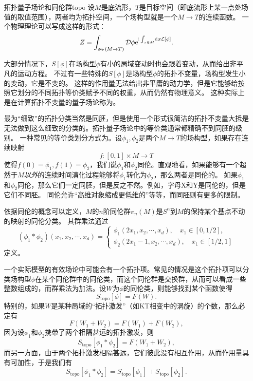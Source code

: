 \begin{back}{拓扑量子场论和同伦群}{topo}
    设$M$是底流形，$T$是目标空间（即底流形上某一点处场值的取值范围），两者均为拓扑空间，一个场构型就是一个$M \to T$的连续函数。
    一个物理理论可以写成这样的形式：
    \[
        Z = \int_{\phi \in (M \to T)} \mathcal{D} \phi \mathrm{e}^{\mathrm{i} \int_{x \in M} \dd{x} \mathcal{L}[\phi]}.
    \]

    大部分情况下，$S[\phi]$在场构型$\phi$有小的局域变动时也会跟着变动，从而给出非平凡的运动方程。
    不过有一些特殊的$S[\phi]$是场构型$\phi$的拓扑不变量，场构型发生小的变动，它是不变的。
    这样的作用量无法给出非平庸的动力学，但是它能够给按照它划分的不同拓扑等价类赋予不同的权重，从而仍然有物理意义。
    这种实际上是在计算拓扑不变量的量子场论称为。

    最为“细致”的拓扑分类当然是同胚，但是使用一个形式很简洁的拓扑不变量大抵是无法做到这么细致的分类的。拓扑量子场论中的等价类通常都精确不到同胚的级别。
    一种常见的等价类划分方式为。设$\phi_1, \phi_2$是两个$M \to T$的场构型，如果存在连续映射
    \[
        f: [0, 1] \times M \to T
    \]
    使得$f(0) = \phi_1, f(1) = \phi_2$，我们说$\phi_1$和$\phi_2$同伦。直观地看，如果能够有一个超然于$M$\emph{以外}的连续时间演化过程能够将$\phi_1$转化为$\phi_2$，那么两者是同伦的。
    如果$\phi_1$和$\phi_2$同伦，那么它们一定同胚，但是反之不然。例如，字母X和Y是同伦的，但是它们不同胚。
    同伦允许“高维对象缩成更低维的”等等，而同胚则有更多的限制。
    
    依据同伦的概念可以定义，$M$的$n$阶同伦群$\pi_n(M)$是$S^n$到$M$的保持某个基点不动的映射的同伦分类。
    其群乘法通过
    \begin{equation}
        (\phi_1 * \phi_2)(x_1, x_2, \cdots, x_d) = \begin{cases}
            \phi_1(2 x_1, x_2, \cdots, x_d), \quad x_1 \in [0, 1/2], \\
            \phi_2(2 x_1 - 1, x_2, \cdots, x_d), \quad x_1 \in [1/2, 1]
        \end{cases}
    \end{equation}
    定义。

    一个实际模型的有效场论中可能会有一个拓扑项。常见的情况是这个拓扑项可以分类场构型$\phi$在某个同伦群中的同伦类，而这个同伦群是交换群，从而可以看成一些整数组成的，而群乘法为加法。设$W$为$\phi$的同伦类，则能够找到某个函数使得
    \begin{equation}
        S_\text{topo}[\phi] = F(W).
    \end{equation}
    特别的，如果$W$是某种局域的“拓扑激发”（如KT相变中的涡旋）的个数，那么必定有
    \begin{equation}
        F(W_1 + W_2) = F(W_1) + F(W_2),
    \end{equation}
    因为设$\phi_1$和$\phi_2$携带了两个相隔甚远的拓扑激发，则
    \[
        S_\text{topo}[\phi_1 * \phi_2] = F(W_1 + W_2),
    \]
    而另一方面，由于两个拓扑激发相隔甚远，它们彼此没有相互作用，从而作用量具有可加性，于是我们有
    \[
        S_\text{topo}[\phi_1 * \phi_2] = S_\text{topo}[\phi_1] + S_\text{topo}[\phi_2].
    \]


\end{back}
